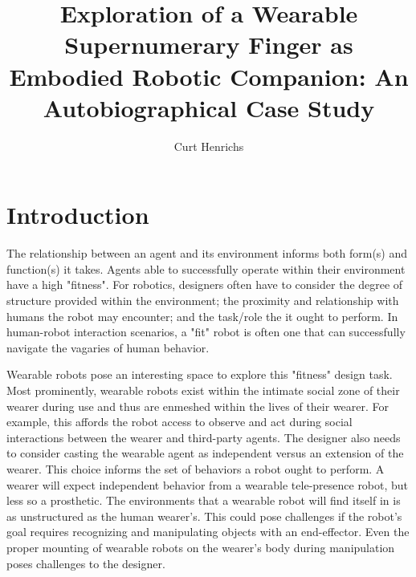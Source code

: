\documentclass[letterpaper, 10 pt, conference]{ieeeconf}  %
\begin{document}
\title{\LARGE \bf Exploration of a Wearable Supernumerary Finger as Embodied Robotic Companion: An Autobiographical Case Study}

\author{Curt Henrichs}


\maketitle
\thispagestyle{empty}
\pagestyle{empty}


\begin{abstract}

\end{abstract}

\section{Introduction}

The relationship between an agent and its environment informs both form(s) and function(s) it takes. Agents able to successfully operate within their environment have a high "fitness". For robotics, designers often have to consider the degree of structure provided within the environment; the proximity and relationship with humans the robot may encounter; and the task/role the it ought to perform. In human-robot interaction scenarios, a "fit" robot is often one that can successfully navigate the vagaries of human behavior. 

Wearable robots pose an interesting space to explore this "fitness" design task. Most prominently, wearable robots exist within the intimate social zone of their wearer during use and thus are enmeshed within the lives of their wearer. For example, this affords the robot access to observe and act during social interactions between the wearer and third-party agents. The designer also needs to consider casting the wearable agent as independent versus an extension of the wearer. This choice informs the set of behaviors a robot ought to perform. A wearer will expect independent behavior from a wearable tele-presence robot, but less so a prosthetic. The environments that a wearable robot will find itself in is as unstructured as the human wearer's. This could pose challenges if the robot's goal requires recognizing and manipulating objects with an end-effector. Even the proper mounting of wearable robots on the wearer's body during manipulation poses challenges to the designer.
\end{document}
